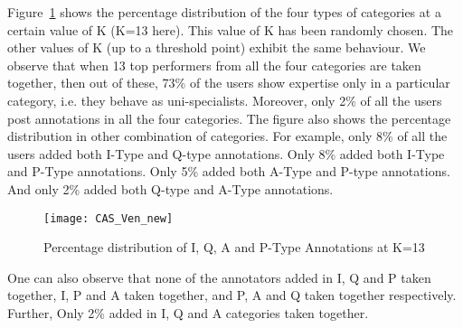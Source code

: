 \documentclass{llncs}
\begin{document}
Figure~\ref{fig:Percentage} shows the percentage distribution of the four types of categories at a certain value of K (K=13 here). This value of K has been randomly chosen. The other values of K (up to a threshold point) exhibit the same behaviour. We observe that when 13 top performers from all the four categories are taken together, then out of these, 73\% of the users show expertise only in a particular category, i.e. they behave as uni-specialists. Moreover, only 2\% of all the users post annotations in all the four categories. The figure also shows the percentage distribution in other combination of categories. For example, only 8\% of all the users added both I-Type and Q-type annotations. Only 8\% added both I-Type and P-Type annotations. Only 5\% added both A-Type and P-type annotations. And only 2\% added both Q-type and A-Type annotations. \\

\begin{figure}
\centering
\texttt{[image: CAS\_Ven\_new]}
\caption{Percentage distribution of  I, Q, A and P-Type Annotations at K=13}
\label{fig:Percentage}
\end{figure}
 
One can also observe that none of the annotators added in I, Q and P taken together, I, P and A taken together, and P, A and Q taken together respectively. Further, Only 2\% added in I, Q and A categories taken together.
\end{document}

